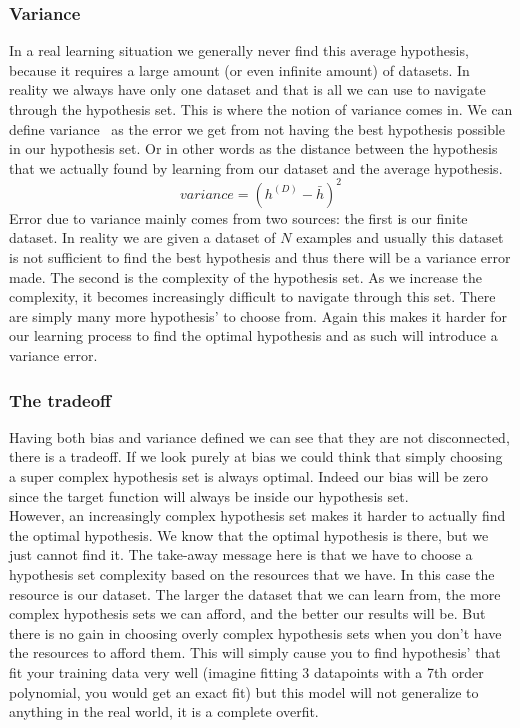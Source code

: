 \subsubsection{Variance}
In a real learning situation we generally never find this average hypothesis, because it requires a large amount (or even infinite amount) of datasets. In reality we always have only one dataset and that is all we can use to navigate through the hypothesis set. This is where the notion of variance comes in. We can define variance~\cite{caltechmachinelearning} as the error we get from not having the best hypothesis possible in our hypothesis set. Or in other words as the distance between the hypothesis that we actually found by learning from our dataset and the average hypothesis.
$$
variance = (h^{(D)} - \bar{h})^{2}
$$
Error due to variance mainly comes from two sources: the first is our finite dataset. In reality we are given a dataset of $N$ examples and usually this dataset is not sufficient to find the best hypothesis and thus there will be a variance error made. The second is the complexity of the hypothesis set. As we increase the complexity, it becomes increasingly difficult to navigate through this set. There are simply many more hypothesis' to choose from. Again this makes it harder for our learning process to find the optimal hypothesis and as such will introduce a variance error.
\subsubsection{The tradeoff}
Having both bias and variance defined we can see that they are not disconnected, there is a tradeoff. If we look purely at bias we could think that simply choosing a super complex hypothesis set is always optimal. Indeed our bias will be zero since the target function will always be inside our hypothesis set. \\
However, an increasingly complex hypothesis set makes it harder to actually find the optimal hypothesis. We know that the optimal hypothesis is there, but we just cannot find it. The take-away message here is that we have to choose a hypothesis set complexity based on the resources that we have. In this case the resource is our dataset. The larger the dataset that we can learn from, the more complex hypothesis sets we can afford, and the better our results will be. But there is no gain in choosing overly complex hypothesis sets when you don't have the resources to afford them. This will simply cause you to find hypothesis' that fit your training data very well (imagine fitting 3 datapoints with a 7th order polynomial, you would get an exact fit) but this model will not generalize to anything in the real world, it is a complete overfit.
